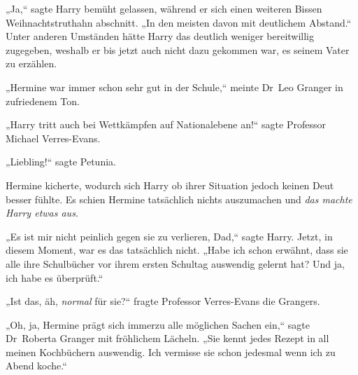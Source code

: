 „Ja,“ sagte Harry bemüht gelassen, während er sich einen weiteren Bissen Weihnachtstruthahn abschnitt. „In den meisten davon mit deutlichem Abstand.“ Unter anderen Umständen hätte Harry das deutlich weniger bereitwillig zugegeben, weshalb er bis jetzt auch nicht dazu gekommen war, es seinem Vater zu erzählen.

„Hermine war immer schon sehr gut in der Schule,“ meinte Dr~Leo Granger in zufriedenem Ton.

„Harry tritt auch bei Wettkämpfen auf Nationalebene an!“ sagte Professor Michael Verres-Evans.

„Liebling!“ sagte Petunia.

Hermine kicherte, wodurch sich Harry ob ihrer Situation jedoch keinen Deut besser fühlte. Es schien Hermine tatsächlich nichts auszumachen und \emph{das machte Harry etwas aus.}

„Es ist mir nicht peinlich gegen sie zu verlieren, Dad,“ sagte Harry. Jetzt, in diesem Moment, war es das tatsächlich nicht. „Habe ich schon erwähnt, dass sie alle ihre Schulbücher vor ihrem ersten Schultag auswendig gelernt hat? Und ja, ich habe es überprüft.“

„Ist das, äh, \emph{normal} für sie?“ fragte Professor Verres-Evans die Grangers.

„Oh, ja, Hermine prägt sich immerzu alle möglichen Sachen ein,“ sagte Dr~Roberta Granger mit fröhlichem Lächeln. „Sie kennt jedes Rezept in all meinen Kochbüchern auswendig. Ich vermisse sie schon jedesmal wenn ich zu Abend koche.“

